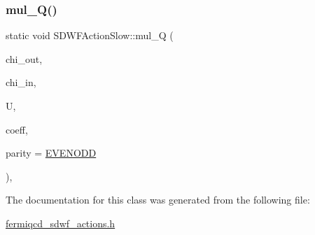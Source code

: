 \subsubsection{\texorpdfstring{mul\+\_\+\+Q()}{mul\_Q()}}
{\footnotesize\ttfamily static void S\+D\+W\+F\+Action\+Slow\+::mul\+\_\+Q (\begin{DoxyParamCaption}\item[{\hyperlink{classsdwf__field}{sdwf\+\_\+field} \&}]{chi\+\_\+out,  }\item[{\hyperlink{classsdwf__field}{sdwf\+\_\+field} \&}]{chi\+\_\+in,  }\item[{\hyperlink{classgauge__field}{gauge\+\_\+field} \&}]{U,  }\item[{\hyperlink{classcoefficients}{coefficients} \&}]{coeff,  }\item[{int}]{parity = {\ttfamily \hyperlink{mdp__global__vars_8h_a4c9de81f2de5a74b588107b6c0afb9ee}{E\+V\+E\+N\+O\+DD}} }\end{DoxyParamCaption})\hspace{0.3cm}{\ttfamily [inline]}, {\ttfamily [static]}}



The documentation for this class was generated from the following file\+:\begin{DoxyCompactItemize}
\item 
\hyperlink{fermiqcd__sdwf__actions_8h}{fermiqcd\+\_\+sdwf\+\_\+actions.\+h}\end{DoxyCompactItemize}
